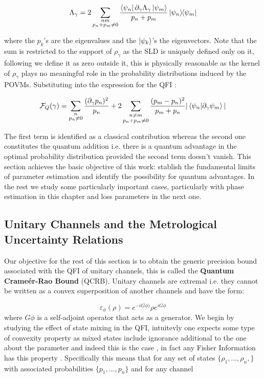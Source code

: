 \begin{equation}
  \Lambda_{\gamma} = 2\sum_{\substack{nm\\ p_{n}+p_{m}\neq 0}}\frac{\bra{\psi_{n}}\partial_{\gamma}\Lambda_{\gamma}\ket{\psi_{m}}}{p_{n} + p_{m}}\ketbratwo{\psi_{n}}{\psi_{m}}
\end{equation}

where the $p_{k}$'s are the eigenvalues and the $\ket{\psi_{k}}$'s the eigenvectors. Note that the sum is restricted to the support of
$\rho_{\gamma}$ as the SLD is uniquely defined only on it, following \cite{braunstein_statistical_1994} we define it as zero outside it,
this is physically reasonable as the kernel of $\rho_{\gamma}$ plays no meaningful role in the probability distributions induced by the POVMs.
Substituting into the expression for the QFI \cite{paris_quantum_2009}:

\begin{equation}
  \mathcal{F}_{Q}(\gamma) = \sum_{\substack{n\\p_{n}\neq 0}} \frac{(\partial_{\gamma}p_{n})^{2}}{p_{n}} + 2\sum_{\substack{n\neq m\\p_{n} +p_{m}\neq 0}}
  \frac{(p_{m}-p_{n})^{2}}{p_{m}+p_{n}}|\braket{\psi_{n}|\partial_{\gamma}\psi_{m}}|
\end{equation}

The first term is identified as a classical contribution whereas the second one constitutes the quantum addition i.e. there is a quantum
advantage in the optimal probability distribution provided the second term doesn't vanish. This section achieves the basic objective of this
work: stablish the fundamental limits of parameter estimation and identify the possibility for quantum advantages. In the rest we study some particularly important cases, particularly  with phase estimation in this chapter and loss parameters in the next one.

\subsection{Unitary Channels and the Metrological Uncertainty Relations}
Our objective for the rest of this section is to obtain the generic precision bound associated with the QFI of  unitary channels,
this is called the \textbf{Quantum Crame\'er-Rao Bound} (QCRB).
Unitary channels are extremal \cite{watrous2018theory,demkowicz-dobrzanski_elusive_2012} i.e. they
cannot be written as a convex superposition of another channels and have the form:

\begin{equation}
  \varepsilon_{\phi}(\rho)=e^{-iG\phi)}\rho e^{iG\phi}
\end{equation}
where $G\phi$ is a self-adjoint operator that acts as a generator. We begin by studying the effect of state mixing in the QFI, intuitevly one
expects some type of convexity property as mixed states include ignorance additional to the one about the parameter and indeed this is the case \cite{yu2013quantum}, in fact any Fisher Information has this property \cite{cohen1968fisher}. Specifically
this means that for any set of states $\{\rho_1, \dots, \rho_n,\}$
with associated probabilities $\{p_1,\dots, p_n\}$ and for any channel

